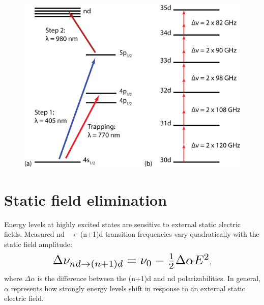 \documentclass[landscape]{sciposter}
\begin{document}
\begin{multicols}{4}

\begin{figure}
\begin{center}
\includegraphics[scale = 0.75]{excitation.png}
\end{center}
\end{figure}


\section*{\large Static field elimination}
Energy levels at highly excited states are sensitive to external static electric fields. Measured nd $\rightarrow$ (n+1)d transition frequencies vary quadratically with the static field amplitude:
\begin{equation*}
\resizebox{0.65\hsize}{!}{$\Delta \nu_{nd \rightarrow (n+1)d} = \nu_{0} - \frac{1}{2} \Delta \alpha E^2$},
\end{equation*}
where $\Delta \alpha$ is the difference between the (n+1)d and nd polarizabilities. In general, $\alpha$ represents how strongly energy levels shift in response to an external static electric field. 


\end{multicols}
\end{document}

